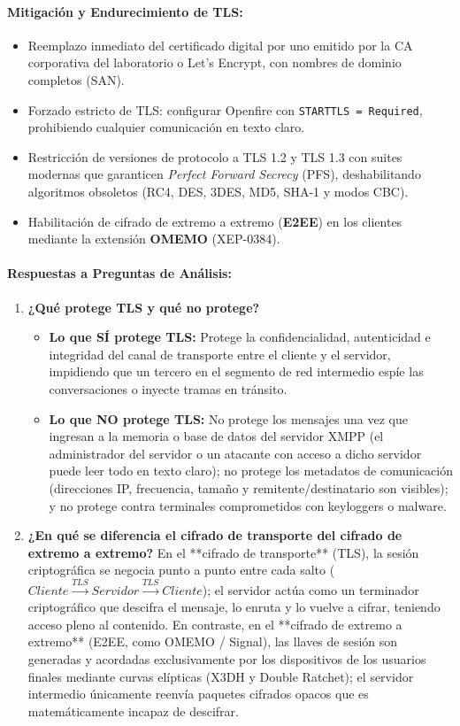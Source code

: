 \documentclass[11pt,letterpaper]{article}
\begin{document}
\paragraph{Mitigación y Endurecimiento de TLS:}
\begin{itemize}
    \item Reemplazo inmediato del certificado digital por uno emitido por la CA corporativa del laboratorio o Let's Encrypt, con nombres de dominio completos (SAN).
    \item Forzado estricto de TLS: configurar Openfire con \texttt{STARTTLS = Required}, prohibiendo cualquier comunicación en texto claro.
    \item Restricción de versiones de protocolo a TLS 1.2 y TLS 1.3 con suites modernas que garanticen \textit{Perfect Forward Secrecy} (PFS), deshabilitando algoritmos obsoletos (RC4, DES, 3DES, MD5, SHA-1 y modos CBC).
    \item Habilitación de cifrado de extremo a extremo (\textbf{E2EE}) en los clientes mediante la extensión \textbf{OMEMO} (XEP-0384).
\end{itemize}

\paragraph{Respuestas a Preguntas de Análisis:}
\begin{enumerate}
    \item \textbf{¿Qué protege TLS y qué no protege?}
    \begin{itemize}
        \item \textbf{Lo que SÍ protege TLS:} Protege la confidencialidad, autenticidad e integridad del canal de transporte entre el cliente y el servidor, impidiendo que un tercero en el segmento de red intermedio espíe las conversaciones o inyecte tramas en tránsito.
        \item \textbf{Lo que NO protege TLS:} No protege los mensajes una vez que ingresan a la memoria o base de datos del servidor XMPP (el administrador del servidor o un atacante con acceso a dicho servidor puede leer todo en texto claro); no protege los metadatos de comunicación (direcciones IP, frecuencia, tamaño y remitente/destinatario son visibles); y no protege contra terminales comprometidos con keyloggers o malware.
    \end{itemize}
    \item \textbf{¿En qué se diferencia el cifrado de transporte del cifrado de extremo a extremo?} En el **cifrado de transporte** (TLS), la sesión criptográfica se negocia punto a punto entre cada salto ($Cliente \xrightarrow{TLS} Servidor \xrightarrow{TLS} Cliente$); el servidor actúa como un terminador criptográfico que descifra el mensaje, lo enruta y lo vuelve a cifrar, teniendo acceso pleno al contenido. En contraste, en el **cifrado de extremo a extremo** (E2EE, como OMEMO / Signal), las llaves de sesión son generadas y acordadas exclusivamente por los dispositivos de los usuarios finales mediante curvas elípticas (X3DH y Double Ratchet); el servidor intermedio únicamente reenvía paquetes cifrados opacos que es matemáticamente incapaz de descifrar.
\end{enumerate}
\end{document}
